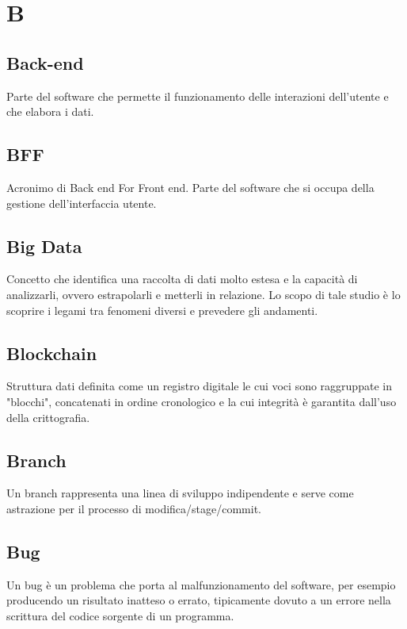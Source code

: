 \section*{B}
\markright{}

\subsection*{Back-end}
Parte del software che permette il funzionamento delle interazioni dell'utente e che elabora i dati.

\subsection*{BFF}
Acronimo di Back end For Front end. Parte del software che si occupa della gestione dell'interfaccia utente.

\subsection*{Big Data}
Concetto che identifica una raccolta di dati molto estesa e la capacità di analizzarli, ovvero estrapolarli e metterli in relazione. Lo scopo di tale studio è lo scoprire i legami tra fenomeni diversi e prevedere gli andamenti.

\subsection*{Blockchain}
Struttura dati definita come un registro digitale le cui voci sono raggruppate in "blocchi", concatenati in ordine cronologico e la cui integrità è garantita dall'uso della crittografia.

\subsection*{Branch}
Un branch rappresenta una linea di sviluppo indipendente e serve come astrazione per il processo di modifica/stage/commit.

\subsection*{Bug}
Un bug è un problema che porta al malfunzionamento del software, per esempio producendo un risultato inatteso o errato, tipicamente dovuto a un errore nella scrittura del codice sorgente di un programma. 

